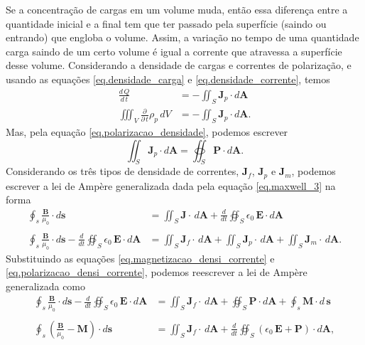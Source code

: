 Se a concentra\c{c}\~ao de cargas em um volume muda, ent\~ao essa diferen\c{c}a entre a quantidade inicial e a final tem que ter passado pela superf\'icie (saindo ou entrando) que engloba o volume. Assim, a varia\c{c}\~ao no tempo de uma quantidade carga saindo de um certo volume \'e igual a corrente que atravessa a superf\'icie desse volume. Considerando a densidade de cargas e correntes de polariza\c{c}\~ao, e usando as equa\c{c}\~oes \ref{eq.densidade_carga} e \ref{eq.densidade_corrente}, temos
\begin{align*}
\frac{d\,Q}{d\,t}&=-\iint_S\mathbf{J}_p\cdot d\mathbf{A}\\
\iiint_V\frac{\partial}{\partial\,t}\rho_p\,dV&=-\iint_S\mathbf{J}_p\cdot d\mathbf{A}.
\end{align*}
Mas, pela equa\c{c}\~ao \ref{eq.polarizacao_densidade}, podemos escrever
\begin{equation}\label{eq.polarizacao_densi_corrente}
\iint_S\mathbf{J}_p\cdot d\mathbf{A}=\oiint_S\mathbf{P}\cdot d\mathbf{A}.
\end{equation} 
Considerando os tr\^es tipos de densidade de correntes, $\mathbf{J}_f$, $\mathbf{J}_p$ e $\mathbf{J}_m$, podemos escrever a lei de Amp\`ere generalizada dada pela equa\c{c}\~ao \ref{eq.maxwell_3} na forma
\begin{align*}
\oint_s\frac{\mathbf{B}}{\mu_0}\cdot d\mathbf{s}&=\iint_S\mathbf{J}\cdot\,d\mathbf{A}+\frac{d}{dt}\oiint_S\epsilon_0\,\textbf{E}\cdot\textit{d}\textbf{A}\\\\
\oint_s\frac{\mathbf{B}}{\mu_0}\cdot d\mathbf{s}-\frac{d}{dt}\oiint_S\epsilon_0\,\textbf{E}\cdot\textit{d}\textbf{A}&=\iint_S\mathbf{J}_f\cdot\,d\mathbf{A}+\iint_S\mathbf{J}_p\cdot\,d\mathbf{A}+\iint_S\mathbf{J}_m\cdot\,d\mathbf{A}.
\end{align*}
Substituindo as equa\c{c}\~oes \ref{eq.magnetizacao_densi_corrente} e \ref{eq.polarizacao_densi_corrente}, podemos reescrever a lei de Amp\`ere generalizada como
\begin{align*}
\oint_s\frac{\mathbf{B}}{\mu_0}\cdot d\mathbf{s}-\frac{d}{dt}\oiint_S\epsilon_0\,\textbf{E}\cdot\textit{d}\textbf{A}&=\iint_S\mathbf{J}_f\cdot\,d\mathbf{A}+\oiint_S\mathbf{P}\cdot d\mathbf{A}+\oint_s \mathbf{M}\cdot d\,\mathbf{s}\\\\
\oint_s\left(\frac{\mathbf{B}}{\mu_0}-\mathbf{M}\right)\cdot d\mathbf{s}&=\iint_S\mathbf{J}_f\cdot\,d\mathbf{A}+\frac{d}{dt}\oiint_S(\epsilon_0\,\textbf{E}+\mathbf{P})\cdot\textit{d}\textbf{A},
\end{align*}
